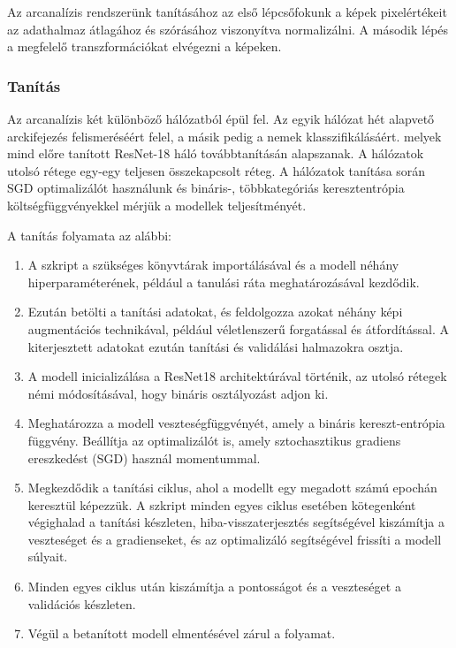 \documentclass[12pt,a4]{article}
\begin{document}
                Az arcanalízis rendszerünk tanításához az első lépcsőfokunk a képek pixelértékeit az adathalmaz átlagához és szórásához viszonyítva normalizálni. A második lépés a megfelelő transzformációkat elvégezni a képeken.

            \subsubsection{Tanítás}
                
                    Az arcanalízis két különböző hálózatból épül fel. Az egyik hálózat hét alapvető arckifejezés felismeréséért felel, a másik pedig a nemek klasszifikálásáért.
                    melyek mind előre tanított ResNet-18 háló továbbtanításán alapszanak.
                    A hálózatok utolsó rétege egy-egy teljesen összekapcsolt réteg.
                    A hálózatok tanítása során SGD optimalizálót használunk és bináris-, többkategóriás keresztentrópia költségfüggvényekkel mérjük a modellek teljesítményét.

                    A tanítás folyamata az alábbi: 
                        \begin{enumerate}
                            \item A szkript a szükséges könyvtárak importálásával és a modell néhány hiperparaméterének, például a tanulási ráta meghatározásával kezdődik.

                            \item Ezután betölti a tanítási adatokat, és feldolgozza azokat néhány képi augmentációs technikával, például véletlenszerű forgatással és átfordítással. A kiterjesztett adatokat ezután tanítási és validálási halmazokra osztja.

                            \item A modell inicializálása a ResNet18 architektúrával történik, az utolsó rétegek némi módosításával, hogy bináris osztályozást adjon ki. 

                            \item Meghatározza a modell veszteségfüggvényét, amely a bináris kereszt-entrópia függvény. Beállítja az optimalizálót is, amely sztochasztikus gradiens ereszkedést (SGD) használ momentummal.

                            \item Megkezdődik a tanítási ciklus, ahol a modellt egy megadott számú epochán keresztül képezzük. A szkript minden egyes ciklus esetében kötegenként végighalad a tanítási készleten, hiba-visszaterjesztés segítségével kiszámítja a veszteséget és a gradienseket, és az optimalizáló segítségével frissíti a modell súlyait.

                            \item Minden egyes ciklus után kiszámítja a pontosságot és a veszteséget a validációs készleten.

                            \item Végül a betanított modell elmentésével zárul a folyamat.
                        \end{enumerate}\\
\end{document}
